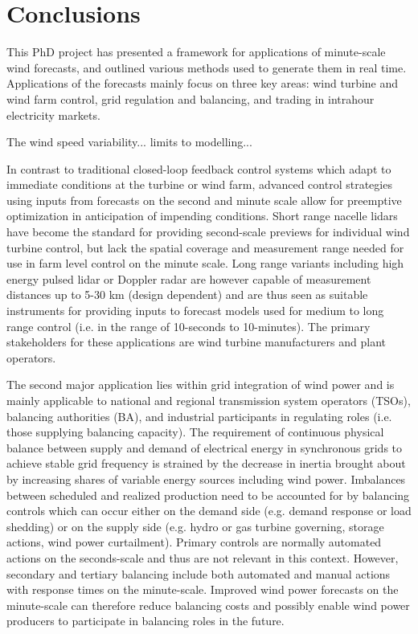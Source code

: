 \chapter{Conclusions}
\label{sec:conclusions}

\clearpage

This PhD project has presented a framework for applications of minute-scale wind forecasts, and outlined various methods used to generate them in real time. Applications of the forecasts mainly focus on three key areas: wind turbine and wind farm control, grid regulation and balancing, and trading in intrahour electricity markets. 

The wind speed variability... limits to modelling...

In contrast to traditional closed-loop feedback control systems which adapt to immediate conditions at the turbine or wind farm, advanced control strategies using inputs from forecasts on the second and minute scale allow for preemptive optimization in anticipation of impending conditions. Short range nacelle lidars have become the standard for providing second-scale previews for individual wind turbine control, but lack the spatial coverage and measurement range needed for use in farm level control on the minute scale. Long range variants including high energy pulsed lidar or Doppler radar are however capable of measurement distances up to 5-30 km (design dependent) and are thus seen as suitable instruments for providing inputs to forecast models used for medium to long range control (i.e. in the range of 10-seconds to 10-minutes). The primary stakeholders for these applications are wind turbine manufacturers and plant operators.

The second major application lies within grid integration of wind power and is mainly applicable to national and regional transmission system operators (TSOs), balancing authorities (BA), and industrial participants in regulating roles (i.e. those supplying balancing capacity). The requirement of continuous physical balance between supply and demand of electrical energy in synchronous grids to achieve stable grid frequency is strained by the decrease in inertia brought about by increasing shares of variable energy sources including wind power. Imbalances between scheduled and realized production need to be accounted for by balancing controls which can occur either on the demand side (e.g. demand response or load shedding) or on the supply side (e.g. hydro or gas turbine governing, storage actions, wind power curtailment). Primary controls are normally automated actions on the seconds-scale and thus are not relevant in this context. However, secondary and tertiary balancing include both automated and manual actions with response times on the minute-scale. Improved wind power forecasts on the minute-scale can therefore reduce balancing costs and possibly enable wind power producers to participate in balancing roles in the future.

